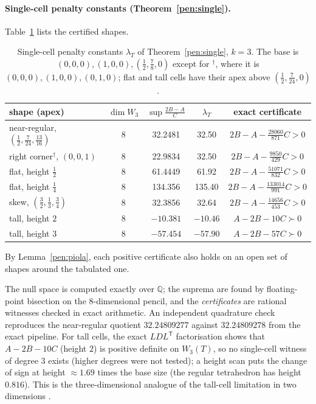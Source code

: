 \paragraph{Single-cell penalty constants (Theorem~\ref{pen:single}).} Table~\ref{tab:pen} lists the certified shapes.
\begin{table}[ht]
\centering\footnotesize
\caption{Single-cell penalty constants $\lambda_T$ of Theorem~\ref{pen:single}, $k=3$. The base is $(0,0,0),(1,0,0),(\frac12,\frac78,0)$ except for $^\dagger$, where it is $(0,0,0),(1,0,0),(0,1,0)$; flat and tall cells have their apex above $(\frac12,\frac7{24},0)$.}\label{tab:pen}
\begin{tabular}{lcccc}
\toprule
shape (apex) & $\dim W_3$ & $\sup\frac{2B-A}C$ & $\lambda_T$ & exact certificate\\
\midrule
near-regular, $(\frac12,\frac7{24},\frac{13}{16})$ & 8 & 32.2481 & 32.50 & $2B-A-\frac{28060}{871}C>0$\\
right corner$^\dagger$, $(0,0,1)$ & 8 & 22.9834 & 32.50 & $2B-A-\frac{9850}{429}C>0$\\
flat, height $\frac12$ & 8 & 61.4449 & 61.92 & $2B-A-\frac{51071}{832}C>0$\\
flat, height $\frac14$ & 8 & 134.356 & 135.40 & $2B-A-\frac{133014}{991}C>0$\\
skew, $(\frac32,\frac13,\frac34)$ & 8 & 32.3856 & 32.64 & $2B-A-\frac{14656}{453}C>0$\\
tall, height $2$ & 8 & $-10.381$ & $-10.46$ & $A-2B-10C\succ0$\\
tall, height $3$ & 8 & $-57.454$ & $-57.90$ & $A-2B-57C\succ0$\\
\bottomrule
\end{tabular}
\end{table}
By Lemma~\ref{pen:piola}, each positive certificate also holds on an open set of shapes around the tabulated one. 

The null space is computed exactly over $\mathbb Q$; the suprema are found by floating-point bisection on the $8$-dimensional pencil, and the \emph{certificates} are rational witnesses checked in exact arithmetic. An independent quadrature check reproduces the near-regular quotient $32.24809277$ against $32.24809278$ from the exact pipeline. For tall cells, the exact $LDL^{\mathsf T}$ factorisation shows that $A-2B-10C$ (height $2$) is positive definite on $W_3(T)$, so no single-cell witness of degree $3$ exists (higher degrees were not tested); a height scan puts the change of sign at height $\approx1.69$ times the base size (the regular tetrahedron has height $0.816$). This is the three-dimensional analogue of the tall-cell limitation in two dimensions \cite{PadhiLong2D}.


